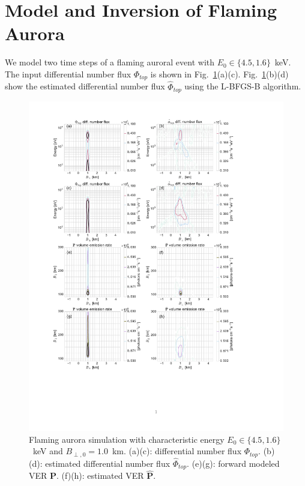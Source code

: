 
\section{Model and Inversion of Flaming Aurora}\label{sec:flame}
We model two time steps of a flaming auroral event with $E_0\in\lbrace{4.5,1.6\rbrace}$~keV. 
The input differential number flux $\Phi_{top}$ is shown in Fig.~\ref{fig:estflame}(a)(c). 
Fig.~\ref{fig:estflame}(b)(d) show the estimated differential number flux $\hat{\Phi}_{top}$ using the L-BFGS-B algorithm. 
%
\begin{figure}\centering
\includegraphics[trim=30 120 100 20,clip,height=0.85\textheight]{gfx/flamesim}
\caption{Flaming aurora simulation with characteristic energy $E_0\in\{4.5,1.6\}$~keV and $B_{\perp,0}=1.0$~km. 
(a)(c): differential number flux $\Phi_{top}$. (b)(d): estimated differential number flux $\hat{\Phi}_{top}$. 
(e)(g): forward modeled VER $\mathbf{P}$.  (f)(h): estimated VER $\mathbf{\hat{P}}$.} \label{fig:estflame}
\end{figure}
